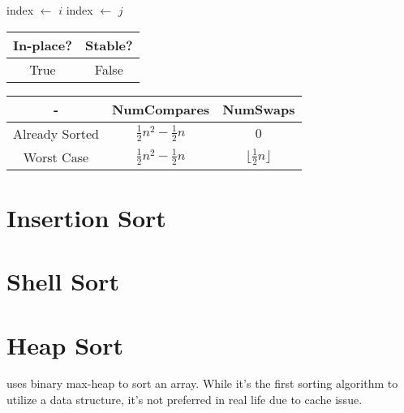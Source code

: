 \documentclass{report}
\begin{document}
\begin{algorithm}
    \begin{algorithmic}[0]
       
        \State index $\gets$ $i$
              \State index $\gets$ $j$
            \EndIf
          \EndFor
          \EndIf
        \EndFor
      \EndProcedure
    \end{algorithmic}
\end{algorithm}

\begin{center}
  \begin{tabular}{ | c | c | }
    \hline
    In-place? & Stable? \\
    \hline
    True & False \\
    \hline
  \end{tabular}
\end{center}

\begin{center}
  \begin{tabular}{ | c | c | c | }
    \hline
    - & NumCompares & NumSwaps \\
    \hline
    Already Sorted & $\frac{1}{2} n^2 - \frac{1}{2} n$ & $0$ \\
    \hline
    Worst Case &  $\frac{1}{2} n^2 - \frac{1}{2} n$ & $\lfloor \frac{1}{2} n \rfloor$ \\
    \hline
  \end{tabular}
\end{center}

\section{Insertion Sort}

\section{Shell Sort}

\section{Heap Sort}

 uses binary max-heap to sort an array. While it's the first sorting algorithm to utilize a data structure, it's not preferred in real life due to cache issue.
\end{document}
